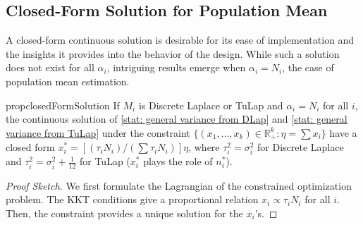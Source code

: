 \documentclass{article}
\theoremstyle{definition}
\begin{document}

\subsection{Closed-Form Solution for Population Mean} \label{subsec: closed form solution}

A closed-form continuous solution is desirable for its ease of implementation and the insights it provides into the behavior of the design. While such a solution does not exist for all $\alpha_i$, intriguing results emerge when $\alpha_i = N_i$, the case of population mean estimation.



\begin{restatable}{prop}{closedFormSolution} \label{prop: solution of DP variance from DLap and TuLap}
    If $M_i$ is Discrete Laplace or TuLap and $\alpha_i = N_i$ for all $i$, the continuous solution of \eqref{stat: general variance from DLap} and \eqref{stat: general variance from TuLap} under the constraint $\{ (x_1,\ldots,x_k) \in \mathbb{R}_{+}^k: \eta = \sum x_i \}$ have a closed form  
        $x_i^* = [(\tau_i N_i)/(\sum \tau_i N_i) ]\eta$,  
    where $\tau_i^2 = \sigma_i^2$ for Discrete Laplace and $\tau_i^2 = \sigma_i^2 + \frac{1}{12}$ for TuLap ($x_i^*$ plays the role of $n_i^*$).
\end{restatable}

\begin{proof}[Proof Sketch] 
    We first formulate the Lagrangian of the constrained optimization problem. The KKT conditions give a proportional relation $x_i \propto \tau_i N_i$ for all $i$. Then, the constraint provides a unique solution for the $x_i$'s.
\end{proof}
\end{document}
